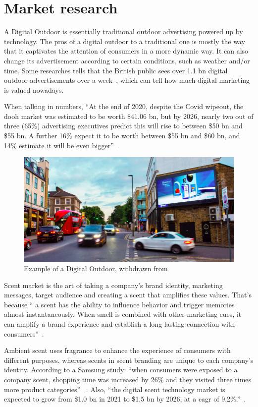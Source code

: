 \section{Market research}
\label{sec:market-research}
A Digital Outdoor is essentially traditional outdoor advertising powered up by technology. 
The pros of a digital outdoor to a traditional one is mostly the way that it captivates the attention of consumers in a more dynamic way. 
It can also change its advertisement according to certain conditions, such as
weather and/or time. Some researches tells that the British public sees over 1.1
\gls{bn} digital outdoor advertisements over a week~\cite{digital-outdoor}, which can tell how much digital marketing is valued nowadays.

When talking in numbers, ``At the end of 2020, despite the Covid wipeout, the \gls{dooh} market was estimated to be worth \$41.06 \gls{bn}, but by 2026, nearly two out of three (65\%) advertising executives predict this will rise to between \$50 \gls{bn} and \$55 \gls{bn}. 
A further 16\% expect it to be worth between \$55 \gls{bn} and \$60 \gls{bn}, and 14\% estimate it will be even bigger''~\cite{outdoor-market}.

\begin{figure}[htb!]
\centering
    \includegraphics[width=0.7\columnwidth]{./img/DigitalOutdoor.png}
  \caption{Example of a Digital Outdoor, withdrawn from~\cite{digital-outdoor}}%
\label{fig:dig-outdoor}
\end{figure}

Scent market is the art of taking a company's brand identity, marketing messages, target audience and creating a scent that amplifies these values. 
That's because `` a scent has the ability to influence behavior and trigger memories almost instantaneously. When smell is combined with other marketing cues, it can amplify a brand experience and establish a long lasting connection with consumers''~\cite{scent-market}.

Ambient scent uses fragrance to enhance the experience of consumers with different purposes, whereas scents in scent branding are unique to each company's identity.
According to a Samsung study: ``when consumers were exposed to a company scent, shopping time was increased by 26\% and they visited three times more product categories'' ~\cite{scent-stats}.
Also, ``the digital scent technology market is expected to grow from \$1.0 \gls{bn} in 2021 to \$1.5 \gls{bn} by 2026, at a \gls{cagr} of 9.2\%.''~\cite{scent-money}.

